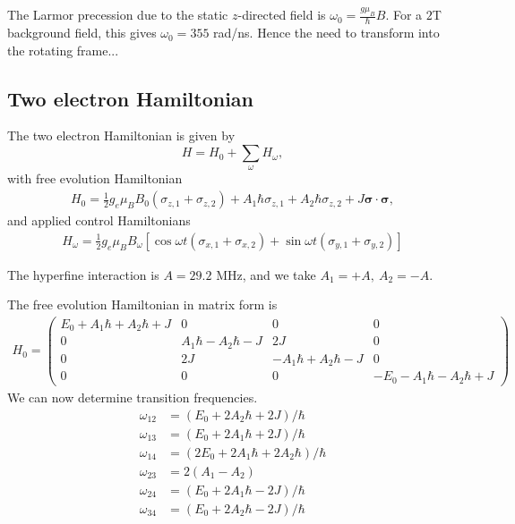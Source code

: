 \documentclass[12pt]{article}
\begin{document}
The Larmor precession due to the static $z$-directed field is $\omega_0=\frac{g\mu_B}{\hbar}B$. For a $2$T background field, this gives $\omega_0 = 355$ rad/ns. Hence the need to transform into the rotating frame...

\subsection{Two electron Hamiltonian}
The two electron Hamiltonian is given by
\begin{equation}
    H=H_0+\sum_\omega H_\omega, 
\end{equation}
with free evolution Hamiltonian
\begin{align}
    H_0 = \frac{1}{2}g_e\mu_BB_0(\sigma_{z,1}+\sigma_{z,2}) + A_1\hbar\sigma_{z,1}+A_2\hbar\sigma_{z,2} + J\bm{\sigma}\cdot\bm{\sigma},
\end{align}
and applied control Hamiltonians
\begin{align}
    H_\omega = \frac{1}{2}g_e\mu_BB_\omega \left[\cos\omega t (\sigma_{x,1}+\sigma_{x,2}) + \sin\omega t(\sigma_{y,1} + \sigma_{y,2})\right]
\end{align}

The hyperfine interaction is\cite{kane_silicon-based_1998,tsai_optimal_2009,kalra_robust_2014} $A=29.2$ MHz, and we take $A_1=+A,\ A_2=-A$.


The free evolution Hamiltonian in matrix form is
\begin{align}
    H_0 = \begin{pmatrix}
    E_0+A_1\hbar+A_2\hbar+J &0 &0 &0\\
    0 &A_1\hbar-A_2\hbar-J &2J &0\\ 
    0 &2J &-A_1\hbar+A_2\hbar-J &0 \\ 
    0 &0 &0 &-E_0-A_1\hbar-A_2\hbar+J
    \end{pmatrix}
\end{align}
We can now determine transition frequencies. 
\begin{align} 
\omega_{12} &= (E_0+2A_2\hbar + 2J)/\hbar\\
\omega_{13} &= (E_0+2A_1\hbar +2J)/\hbar\\
\omega_{14} &= (2E_0 + 2A_1\hbar + 2A_2\hbar)/\hbar\\
\omega_{23} &= 2(A_1 -A_2)\\
\omega_{24} &= (E_0+2A_1\hbar -2J)/\hbar\\
\omega_{34} &= (E_0+2A_2\hbar-2J)/\hbar
\end{align}
\end{document}
